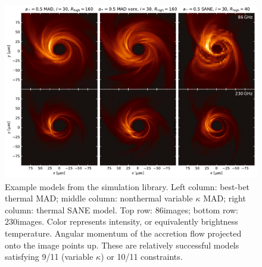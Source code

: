 \begin{figure}
  \centering
  \includegraphics[width=\textwidth]{figures/example_imgs.pdf}
  \caption{Example models from the simulation library.  Left column: best-bet thermal MAD; middle column: nonthermal variable $\kappa$ MAD; right column: thermal SANE model.  Top row: 86\GHz images; bottom row: 230\GHz images.  Color represents intensity, or equivalently brightness temperature.  Angular momentum of the accretion flow projected onto the image points up.  These are relatively successful models satisfying 9/11 (variable $\kappa$) or 10/11 constraints.
  }
  \label{fig:example_imgs}
\end{figure}

